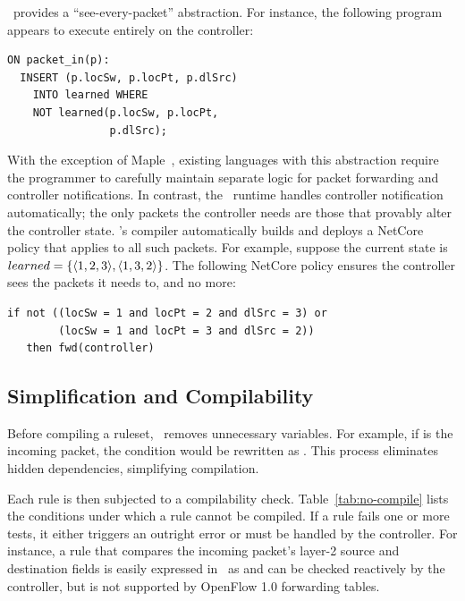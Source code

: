 \flowlog\ provides a ``see-every-packet'' abstraction. For instance, the
following program appears to execute entirely on the controller:
\begin{lstlisting}[label=list:comp2]   
ON packet_in(p):
  INSERT (p.locSw, p.locPt, p.dlSrc) 
    INTO learned WHERE 
    NOT learned(p.locSw, p.locPt, 
                p.dlSrc);
\end{lstlisting}
With the exception of Maple~\cite{voellmy:sigcomm13-maple}, existing languages
with this abstraction require the programmer to carefully maintain 
separate logic for packet forwarding and controller notifications.
In contrast, the
\flowlog\ runtime handles controller notification automatically; the only
packets the controller needs are those that provably alter the
controller state. \flowlog's compiler automatically builds and deploys a NetCore
policy that applies to all such packets. For example, suppose the current state is
$learned = \{ \langle {1,2,3} \rangle, \langle {1,3,2} \rangle \}$. The following NetCore policy
ensures the controller sees the packets it needs to, and no more:
\small\begin{verbatim}
if not ((locSw = 1 and locPt = 2 and dlSrc = 3) or
        (locSw = 1 and locPt = 3 and dlSrc = 2))
   then fwd(controller)
\end{verbatim} \normalsize

\subsection{Simplification and Compilability}
\label{sec:comp-preprocess}

Before compiling a ruleset, \flowlog\ removes
unnecessary variables. For example, if  is the incoming packet, the
condition  would
be rewritten as . This process
eliminates hidden dependencies, simplifying compilation.

Each rule is then subjected to a compilability check.
Table~\ref{tab:no-compile} lists the conditions under which a rule cannot be compiled. 
If a rule fails one or more tests, it either triggers an
outright error or must be handled by the controller. For instance, a
rule that compares the incoming packet's layer-2 source and
destination fields is easily expressed in \flowlog\ as
 and can be checked reactively by the controller,
but is not supported by OpenFlow 1.0 forwarding tables.

